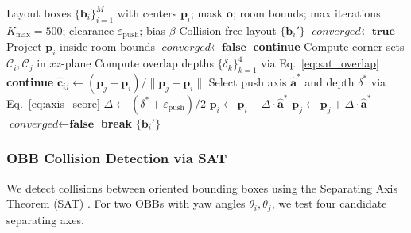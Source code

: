 \begin{algorithm}[t]
\caption{Post-Processing SAT Collision Resolver}
\label{alg:collision_resolver}                        
\begin{algorithmic}[1]
\REQUIRE Layout boxes $\{\mathbf{b}_i\}_{i=1}^{M}$ with centers $\mathbf{p}_i$; mask $\mathbf{o}$; room bounds; max iterations $K_{\max}=500$; clearance $\varepsilon_{\mathrm{push}}$; bias $\beta$
\ENSURE Collision-free layout $\{\mathbf{b}_i'\}$
    \STATE $\textit{converged} \gets \textbf{true}$
    \STATE {}
        \STATE Project $\mathbf{p}_i$ inside room bounds   
         \STATE $\textit{converged} \gets \textbf{false}$ \ENDIF
    \ENDFOR                                 
    \STATE {}
            \STATE \textbf{continue} 
        \ENDIF
        \STATE Compute corner sets $\mathcal{C}_i, \mathcal{C}_j$ in $xz$-plane
        \STATE Compute overlap depths $\{\delta_k\}_{k=1}^{4}$ via Eq.~\eqref{eq:sat_overlap}
            \STATE \textbf{continue} 
        \ENDIF
        \STATE $\hat{\mathbf{c}}_{ij} \gets (\mathbf{p}_j - \mathbf{p}_i) / \|\mathbf{p}_j - \mathbf{p}_i\|$
        \STATE Select push axis $\hat{\mathbf{a}}^*$ and depth $\delta^*$ via Eq.~\eqref{eq:axis_score}
        \STATE $\Delta \gets (\delta^* + \varepsilon_{\mathrm{push}}) / 2$
        \STATE $\mathbf{p}_i \gets \mathbf{p}_i - \Delta \cdot \hat{\mathbf{a}}^*$
        \STATE $\mathbf{p}_j \gets \mathbf{p}_j + \Delta \cdot \hat{\mathbf{a}}^*$     
        \STATE $\textit{converged} \gets \textbf{false}$
    \ENDFOR
        \STATE \textbf{break}
    \ENDIF
\ENDFOR
\RETURN $\{\mathbf{b}_i'\}$
\end{algorithmic}
\end{algorithm}
\subsubsection{OBB Collision Detection via SAT}
\label{sec:method:obb_sat}

We detect collisions between oriented bounding boxes using the Separating Axis Theorem (SAT) \cite{10.1145/237170.237244}. For two OBBs with yaw angles $\theta_i, \theta_j$, we test four candidate separating axes. 

